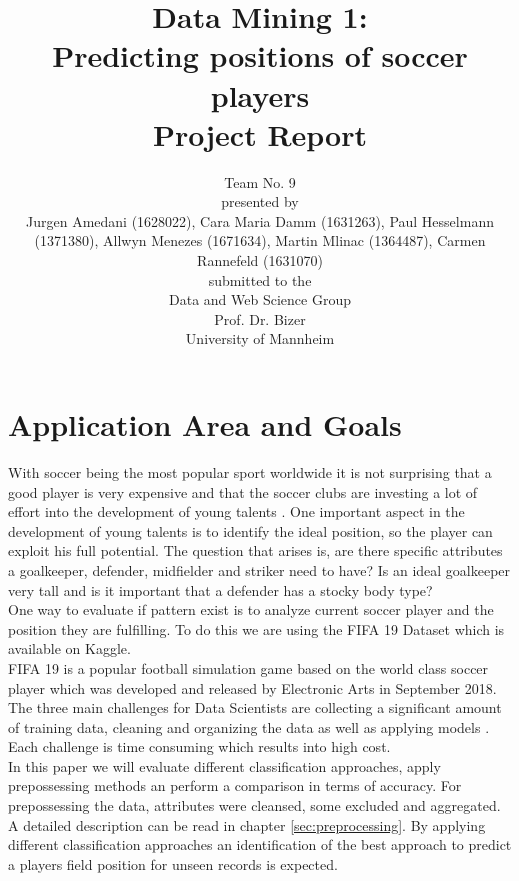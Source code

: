 \documentclass[runningheads]{llncs}
\begin{document}
%
\title{Data Mining 1: \\
Predicting positions of soccer players  \\
Project Report}

\vspace{2cm}
\author{Team No. 9\\
\vspace{1cm}
presented by\\
Jurgen Amedani (1628022), Cara Maria Damm (1631263), Paul Hesselmann (1371380), Allwyn Menezes (1671634), Martin Mlinac (1364487), Carmen Rannefeld (1631070)\\
\vspace{1cm}
submitted to the \\
Data and Web Science Group\\
Prof. Dr. Bizer\\
University of Mannheim}

\institute{}
\maketitle
\newpage



\section{Application Area and Goals}
\label{intro}
With soccer being the most popular sport worldwide it is not surprising that a good player is very expensive and that the soccer clubs are investing a lot of effort into the development of young talents \cite{ref_Transfermarkt}. One important aspect in the development of young talents is to identify the ideal position, so the player can exploit his full potential.
The question that arises is, are there specific attributes a goalkeeper, defender, midfielder and striker need to have? Is an ideal goalkeeper very tall and is it important that a defender has a stocky body type?\\
One way to evaluate if pattern exist is to analyze current soccer player and the position they are fulfilling. To do this we are using the FIFA 19 Dataset which is available on Kaggle.\\
FIFA 19 is a popular football simulation game based on the world class soccer player which was developed and released by Electronic Arts in September 2018. \\
The three main challenges for Data Scientists are collecting a significant amount of training data, cleaning and organizing the data as well as applying models  \cite{ref_Crowdflower}. Each challenge is time consuming which results into high cost.\\
In this paper we will evaluate different classification approaches, apply prepossessing methods an perform a comparison in terms of accuracy. For prepossessing the data, attributes were cleansed, some excluded and aggregated. A detailed description can be read in chapter \ref{sec:preprocessing}.
By applying different classification approaches an identification of the best approach to predict a players field position for unseen records is expected.
\end{document}
